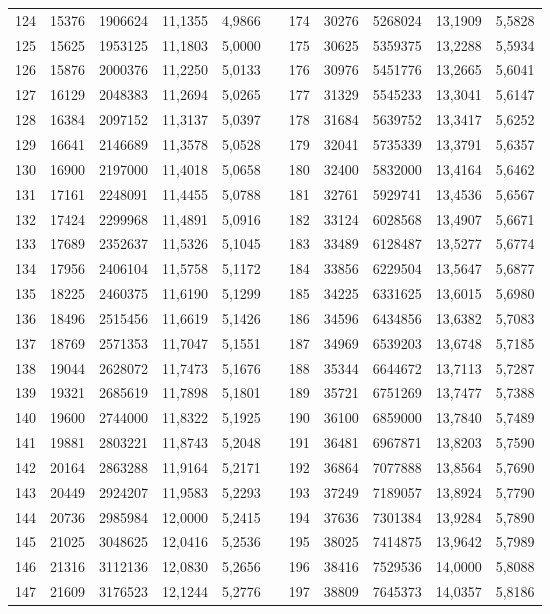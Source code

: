 \begin{longtable}{rrrrrrrrrrr}
124&15376&1906624&11,1355&4,9866&&174&30276&5268024&13,1909&5,5828\\
125&15625&1953125&11,1803&5,0000&&175&30625&5359375&13,2288&5,5934\\
126&15876&2000376&11,2250&5,0133&&176&30976&5451776&13,2665&5,6041\\
127&16129&2048383&11,2694&5,0265&&177&31329&5545233&13,3041&5,6147\\
128&16384&2097152&11,3137&5,0397&&178&31684&5639752&13,3417&5,6252\\
129&16641&2146689&11,3578&5,0528&&179&32041&5735339&13,3791&5,6357\\
130&16900&2197000&11,4018&5,0658&&180&32400&5832000&13,4164&5,6462\\
131&17161&2248091&11,4455&5,0788&&181&32761&5929741&13,4536&5,6567\\
132&17424&2299968&11,4891&5,0916&&182&33124&6028568&13,4907&5,6671\\
133&17689&2352637&11,5326&5,1045&&183&33489&6128487&13,5277&5,6774\\
134&17956&2406104&11,5758&5,1172&&184&33856&6229504&13,5647&5,6877\\
135&18225&2460375&11,6190&5,1299&&185&34225&6331625&13,6015&5,6980\\
136&18496&2515456&11,6619&5,1426&&186&34596&6434856&13,6382&5,7083\\
137&18769&2571353&11,7047&5,1551&&187&34969&6539203&13,6748&5,7185\\
138&19044&2628072&11,7473&5,1676&&188&35344&6644672&13,7113&5,7287\\
139&19321&2685619&11,7898&5,1801&&189&35721&6751269&13,7477&5,7388\\
140&19600&2744000&11,8322&5,1925&&190&36100&6859000&13,7840&5,7489\\
141&19881&2803221&11,8743&5,2048&&191&36481&6967871&13,8203&5,7590\\
142&20164&2863288&11,9164&5,2171&&192&36864&7077888&13,8564&5,7690\\
143&20449&2924207&11,9583&5,2293&&193&37249&7189057&13,8924&5,7790\\
144&20736&2985984&12,0000&5,2415&&194&37636&7301384&13,9284&5,7890\\
145&21025&3048625&12,0416&5,2536&&195&38025&7414875&13,9642&5,7989\\
146&21316&3112136&12,0830&5,2656&&196&38416&7529536&14,0000&5,8088\\
147&21609&3176523&12,1244&5,2776&&197&38809&7645373&14,0357&5,8186\\

\end{longtable}
